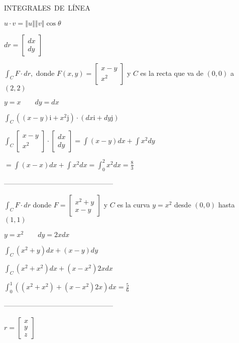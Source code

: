 \documentclass{article}
\begin{document}
INTEGRALES\ DE\ L\'{I}NEA

$u\cdot v=\left\Vert u\right\Vert \left\Vert v\right\Vert \cos \theta $

$dr=\left[ 
\begin{array}{c}
dx \\ 
dy%
\end{array}%
\right] $

$\int_{C}F\cdot dr,$ donde $F\left( x,y\right) =\left[ 
\begin{array}{c}
x-y \\ 
x^{2}%
\end{array}%
\right] $ y $C$ es la recta que va de $\left( 0,0\right) $ a $\left(
2,2\right) $

$y=x\qquad dy=dx$

\bigskip $\int_{C}\left( \left( x-y\right) \text{i}+x^{2}\text{j}\right)
\cdot \left( dx\text{i}+dy\text{j}\right) $

\bigskip $\int_{C}\left[ 
\begin{array}{c}
x-y \\ 
x^{2}%
\end{array}%
\right] \cdot \left[ 
\begin{array}{c}
dx \\ 
dy%
\end{array}%
\right] =\int \left( x-y\right) dx+\int x^{2}dy$

$=\int \left( x-x\right) dx+\int x^{2}dx=\int_{0}^{2}x^{2}dx=\allowbreak 
\frac{8}{3}$

-----------------------------------------------

$\int_{C}F\cdot dr$ donde $F=\left[ 
\begin{array}{c}
x^{2}+y \\ 
x-y%
\end{array}%
\right] $ y $C$ es la curva $y=x^{2}$ desde $\left( 0,0\right) $ hasta $%
\left( 1,1\right) $

$y=x^{2}\qquad dy=2xdx$

$\int_{C}\left( x^{2}+y\right) dx+\left( x-y\right) dy$

$\int_{C}\left( x^{2}+x^{2}\right) dx+\left( x-x^{2}\right) 2xdx$

$\int_{0}^{1}\left( \left( x^{2}+x^{2}\right) +\left( x-x^{2}\right)
2x\right) dx=\allowbreak \frac{5}{6}$

-----------------------------------------------

$r=$\bigskip $\left[ 
\begin{array}{c}
x \\ 
y \\ 
z%
\end{array}%
\right] $
\end{document}
